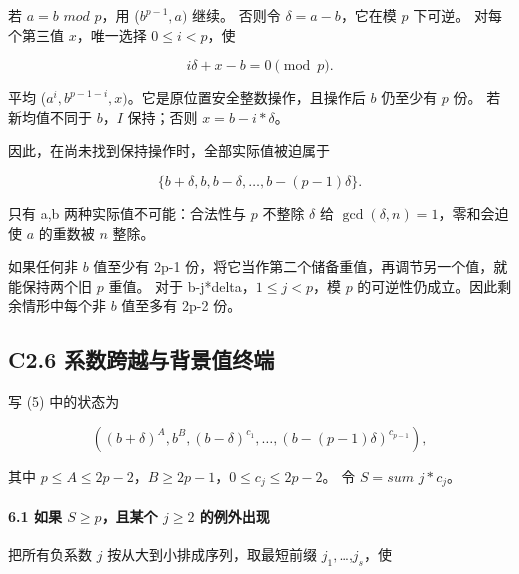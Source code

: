 \documentclass[11pt,a4paper]{article}
\theoremstyle{definition}
\numberwithin{equation}{section}
\begin{document}
{若} {\ensuremath{a=b}} {\ensuremath{mod}} {\ensuremath{p}，用} {(\ensuremath{b^{p-1},a)}} {继续。} {否则令} {\ensuremath{\delta =a-b}，它在模} {\ensuremath{p}} {下可逆。} {对每个第三值} {\ensuremath{x}，唯一选择} {\ensuremath{0\le i<p}，使}

\[
i\delta+x-b=0\pmod p.
\]

{平均} {(\ensuremath{a^{i},b^{p-1-i},x)}。它是原位置安全整数操作，且操作后} {\ensuremath{b}} {仍至少有} {\ensuremath{p}} {份。} {若新均值不同于} {\ensuremath{b}，\ensuremath{I}} {保持；否则} {\ensuremath{x=b-i*\delta }。}

{因此，在尚未找到保持操作时，全部实际值被迫属于}

\[
\{b+\delta,b,b-\delta,\ldots,b-(p-1)\delta\}.
\tag{C2.5}
\]

{只有} {a,b} {两种实际值不可能：合法性与} {\ensuremath{p}} {不整除} {\ensuremath{\delta }} {给} {\ensuremath{\operatorname{gcd}(\delta ,n)=1}，零和会迫使} {\ensuremath{a}} {的重数被} {\ensuremath{n}} {整除。}

{如果任何非} {\ensuremath{b}} {值至少有} {2p-1} {份，将它当作第二个储备重值，再调节另一个值，就能保持两个旧} {\ensuremath{p}} {重值。} {对于} {b-j*delta，\ensuremath{1\le j<p}，模} {\ensuremath{p}} {的可逆性仍成立。因此剩余情形中每个非} {\ensuremath{b}} {值至多有} {2p-2} {份。}

\subsection*{\texorpdfstring{{C2.6} {系数跨越与背景值终端}}{C2.6 系数跨越与背景值终端}}\label{C2-h9}

{写} {(5)} {中的状态为}

\[
((b+\delta)^A,b^B,(b-\delta)^{c_1},\ldots,(b-(p-1)\delta)^{c_{p-1}}),
\]

{其中} {\ensuremath{p\le A\le 2p-2}，\ensuremath{B\ge 2p-1}，\ensuremath{0\le c_{j}\le 2p-2}。} {令} {\ensuremath{S=sum}} {\ensuremath{j*c_{j}}。}

\paragraph*{\texorpdfstring{{6.1} {如果} {\ensuremath{S\ge p}，且某个} {\ensuremath{j\ge 2}} {的例外出现}}{6.1 如果 ，且某个  的例外出现}}\label{C2-h10}

{把所有负系数} {\ensuremath{j}} {按从大到小排成序列，取最短前缀} {\ensuremath{j_{1},}\ldots,\ensuremath{j_{s}}，使}
\end{document}
